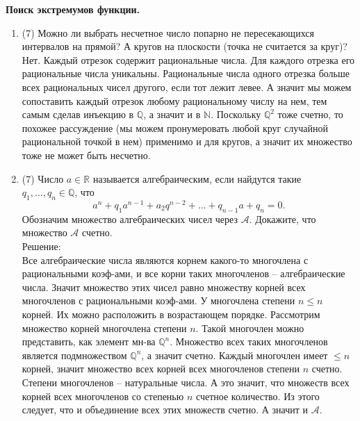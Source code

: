\documentclass[a4paper]{article}
\begin{document}
\noindent\textbf{Поиск экстремумов функции.}

\begin{enumerate}
	\item (7) Можно ли выбрать несчетное число попарно не пересекающихся интервалов на прямой? А кругов на плоскости (точка не считается за круг)?\\
Нет. Каждый отрезок содержит рациональные числа. Для каждого отрезка его рациональные числа уникальны. Рациональные числа одного отрезка больше всех рациональных чисел другого, если тот лежит левее. А значит мы можем сопоставить каждый отрезок любому рациональному числу на нем, тем самым сделав инъекцию в $\mathbb Q$, а значит и в $\mathbb N$. Поскольку $\mathbb Q^2$ тоже счетно, то похожее рассуждение (мы можем пронумеровать любой круг случайной рациональной точкой в нем) применимо и для кругов, а значит их множество тоже не может быть несчетно. 
	\item (7) Число $a\in \mathbb R$ называется алгебраическим, если найдутся такие $q_1,\dots,q_n\in \mathbb Q$, что
	\[
	    a^n + q_1a^{n-1} + a_2q^{n-2} + \dots + q_{n-1}a + q_n = 0.
	\]
    Обозначим множество алгебраических чисел через $\mathcal{A}$. Докажите, что множество $\mathcal{A}$ счетно.\\
    Решение:\\
    Все алгебраические числа являются корнем какого-то многочлена с рациональными коэф-ами, и все корни таких многочленов -- алгебраические числа. Значит множество этих чисел равно множеству корней всех многочленов с рациональными коэф-ами. У многочлена степени $n \le n$ корней. Их можно расположить в возрастающем порядке. Рассмотрим множество корней многочлена степени $n$. Такой многочлен можно представить, как элемент мн-ва $\mathbb Q^n$. Множество всех таких многочленов является подмножеством $\mathbb Q^n$, а значит счетно. Каждый многочлен имеет $\le n$ корней, значит множество всех корней всех многочленов степени $n$ счетно. Степени многочленов -- натуральные числа. А это значит, что множеств всех корней всех многочленов со степенью $n$ счетное количество. Из этого следует, что и объединение всех этих множеств счетно. А значит и $\mathcal{A}$. 
	

\end{enumerate}
\end{document}
